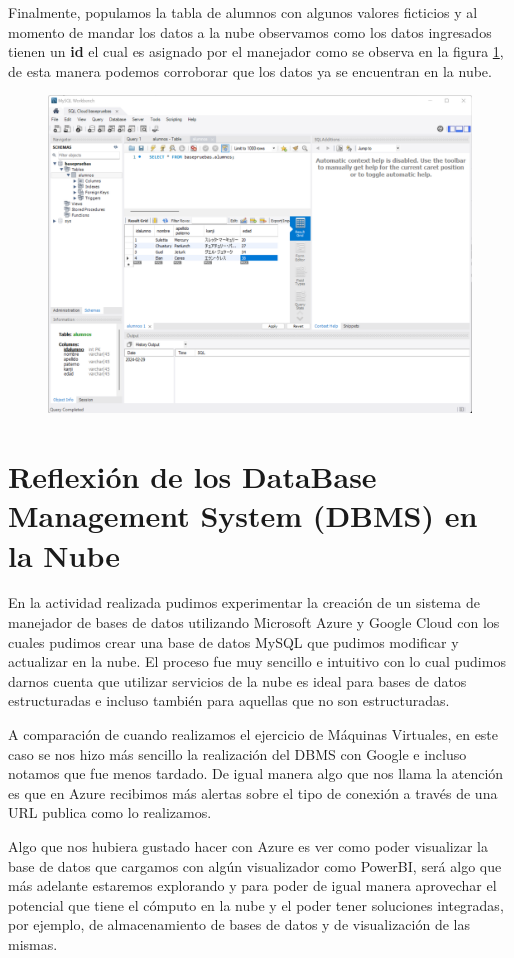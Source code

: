 \documentclass[12pt,a4paper]{article}
\begin{document}
Finalmente, populamos la tabla de alumnos con algunos valores ficticios y al momento de mandar los datos a la nube observamos como los datos ingresados tienen un \textbf{id} el cual es asignado por el manejador como se observa en la figura \ref{fig:2_3_3_Google_DBMS}, de esta manera podemos corroborar que los datos ya se encuentran en la nube.

\begin{figure}[H]
    \centering
    \includegraphics[width=.65\linewidth]{M4_Servicios_Cómputo_en_la_Nube/Tarea_6_Creación_sistema_administración_Base_de_Datos/reporte/figuras/2_3_3_Google_DBMS.png}
    \label{fig:2_3_3_Google_DBMS}
\end{figure}


\section{Reflexión de los DataBase Management System (DBMS) en la Nube}

En la actividad realizada pudimos experimentar la creación de un sistema de manejador de bases de datos utilizando Microsoft Azure y Google Cloud con los cuales pudimos crear una base de datos MySQL que pudimos modificar y actualizar en la nube. El proceso fue muy sencillo e intuitivo con lo cual pudimos darnos cuenta que utilizar servicios de la nube es ideal para bases de datos estructuradas e incluso también para aquellas que no son estructuradas. 

\vspace{.5em}

A comparación de cuando realizamos el ejercicio de Máquinas Virtuales, en este caso se nos hizo más sencillo la realización del DBMS con Google e incluso notamos que fue menos tardado. De igual manera algo que nos llama la atención es que en Azure recibimos más alertas sobre el tipo de conexión a través de una URL publica como lo realizamos. 

\vspace{.5em}

Algo que nos hubiera gustado hacer con Azure es ver como poder visualizar la base de datos que cargamos con algún visualizador como PowerBI, será algo que más adelante estaremos explorando y para poder de igual manera aprovechar el potencial que tiene el cómputo en la nube y el poder tener soluciones integradas, por ejemplo, de almacenamiento de bases de datos y de visualización de las mismas.
\end{document}
